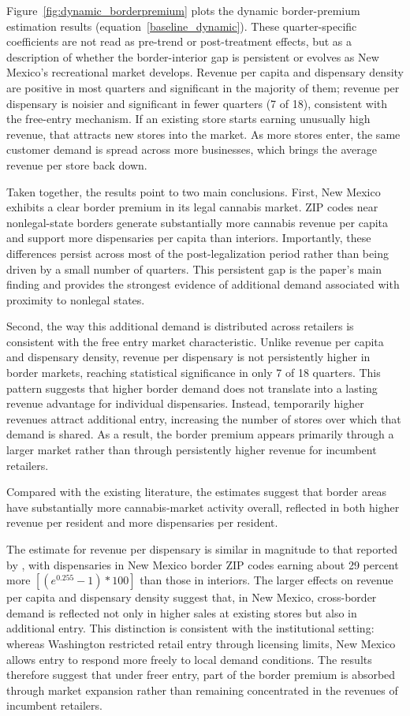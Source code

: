 \documentclass[12pt]{article}
\begin{document}
Figure~\ref{fig:dynamic_borderpremium} plots the dynamic border-premium estimation results (equation~\ref{baseline_dynamic}).
These quarter-specific coefficients are not read as pre-trend or post-treatment effects, but as a description of whether the border-interior gap is persistent or evolves as
New Mexico's recreational market develops. Revenue per capita and dispensary density are positive in most
quarters and significant in the majority of them;
revenue per dispensary is noisier and significant in fewer quarters (7 of 18), consistent with the free-entry
mechanism. If an existing store starts earning unusually high revenue, that attracts new stores into the market. As more stores enter, the same customer demand is spread across more businesses, which brings the average revenue per store back down.

Taken together, the results point to two main conclusions. First, New Mexico exhibits a clear border premium in its legal cannabis market. ZIP codes near nonlegal-state borders generate substantially more cannabis revenue per capita and support more dispensaries per capita than interiors. Importantly, these differences persist across most of the post-legalization period rather than being driven by a small number of quarters. This persistent gap is the paper’s main finding and provides the strongest evidence of additional demand associated with proximity to nonlegal states.

Second, the way this additional demand is distributed across retailers is consistent with the free entry market characteristic. Unlike revenue per capita and dispensary density, revenue per dispensary is not persistently higher in border markets, reaching statistical significance in only 7 of 18 quarters. This pattern suggests that higher border demand does not translate into a lasting revenue advantage for individual dispensaries. Instead, temporarily higher revenues attract additional entry, increasing the number of stores over which that demand is shared. As a result, the border premium appears primarily through a larger market rather than through persistently higher revenue for incumbent retailers. 

Compared with the existing literature, the estimates suggest that border areas have substantially more cannabis-market activity overall, reflected in both higher revenue per resident and more dispensaries per resident.

The estimate for revenue per dispensary is similar in magnitude to that reported by \cite{HansenMillerWeber2020}, with dispensaries in New Mexico border ZIP codes earning about 29 percent more $\left[(e^{0.255}-1)*100\right]$ than those in interiors.
The larger effects on revenue per capita and dispensary density suggest that, in New Mexico, cross-border demand is reflected not only in higher sales at existing stores but also in additional entry. This distinction is consistent with the institutional setting: whereas Washington restricted retail entry through licensing limits, New Mexico allows entry to respond more freely to local demand conditions. The results therefore suggest that under freer entry, part of the border premium is absorbed through market expansion rather than remaining concentrated in the revenues of incumbent retailers.
\end{document}
